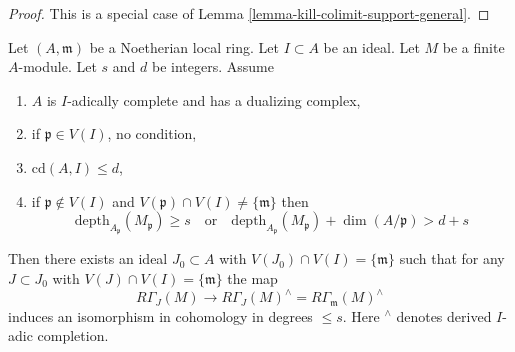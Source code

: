 \begin{proof}
This is a special case of Lemma \ref{lemma-kill-colimit-support-general}.
\end{proof}

\begin{lemma}
\label{lemma-algebraize-local-cohomology}
Let $(A, \mathfrak m)$ be a Noetherian local ring.
Let $I \subset A$ be an ideal. Let $M$ be a finite $A$-module.
Let $s$ and $d$ be integers. Assume
\begin{enumerate}
\item $A$ is $I$-adically complete and has a dualizing complex,
\item if $\mathfrak p \in V(I)$, no condition,
\item $\text{cd}(A, I) \leq d$,
\item if $\mathfrak p \not \in V(I)$ and
$V(\mathfrak p) \cap V(I) \not = \{\mathfrak m\}$ then
$$
\text{depth}_{A_\mathfrak p}(M_\mathfrak p) \geq s
\quad\text{or}\quad
\text{depth}_{A_\mathfrak p}(M_\mathfrak p) + \dim(A/\mathfrak p) > d + s
$$
\end{enumerate}
Then there exists an ideal $J_0 \subset A$ with
$V(J_0) \cap V(I) = \{\mathfrak m\}$ such that for any $J \subset J_0$ with
$V(J) \cap V(I) = \{\mathfrak m\}$ the map
$$
R\Gamma_J(M) \longrightarrow
R\Gamma_J(M)^\wedge = R\Gamma_\mathfrak m(M)^\wedge
$$
induces an isomorphism in cohomology in degrees $\leq s$.
Here ${}^\wedge$ denotes derived $I$-adic completion.
\end{lemma}

